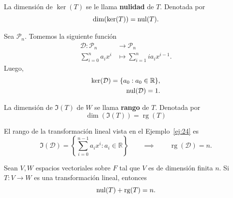 \documentclass[12pt,a4paper]{book}
\newcommand{\rg}{\operatorname{rg}}
\newcommand{\llaves}[1]{\{#1\}}
\newcommand{\llavesgrandes}[1]{\left\{#1\right\}}
\begin{document}
    \begin{definicion}[Nulidad]
    \label{def:22}
        La dimensión de $\ker(T)$ se le llama \textbf{nulidad} de $T$. Denotada por
        \begin{equation*}
            \dim(\ker(T))=\operatorname{nul}(T).
        \end{equation*}
    \end{definicion}

    \begin{ejemplo}
    \label{ej:24}
        Sea $\mathcal{P}_{n}$. Tomemos la siguiente función
        \begin{align*}
            \mathcal{D}: \mathcal{P}_{n} & \to \mathcal{P}_{n}\\
            \sum_{i = 0}^{n}a_{i}x^{i} & \mapsto \sum_{i = 1}^{n}ia_{i}x^{i-1}.
        \end{align*}
        Luego, 
        \begin{align*}
            \ker(\mathcal{D}) = \llaves{a_{0}:a_{0} \in \mathbb{R}},\\
            \nul(\mathcal{D}) = 1.
        \end{align*}
    \end{ejemplo}

    \begin{definicion}[Rango]
    \label{def:23}
        La dimensión de $\Im(T)$ de $W$ se llama \textbf{rango} de $T$. Denotada por
        \begin{equation*}
            \dim(\Im(T))=\rg(T)
        \end{equation*}
    \end{definicion}

    \begin{ejemplo}
    \label{ej:25}
        El rango de la transformación lineal vista en el Ejemplo~\ref{ej:24} es
    \begin{equation*}
        \Im(\mathcal{D})= \llavesgrandes{\sum_{i = 0}^{n-1}a_{i}x^{i}: a_{i} \in \mathbb{R}} \qquad \implies \qquad \rg(\mathcal{D}) = n.
    \end{equation*}
    \end{ejemplo}

    \begin{teorema}
    \label{teo:6}
        Sean $V, W$ espacios vectoriales sobre $F$ tal que $V$ es de dimensión finita $n$. Si $T:V \to W$ es una transformación lineal, entonces
        \begin{equation*}
            \nul(T) + \rg(T) = n.
        \end{equation*}
    \end{teorema}
\end{document}
